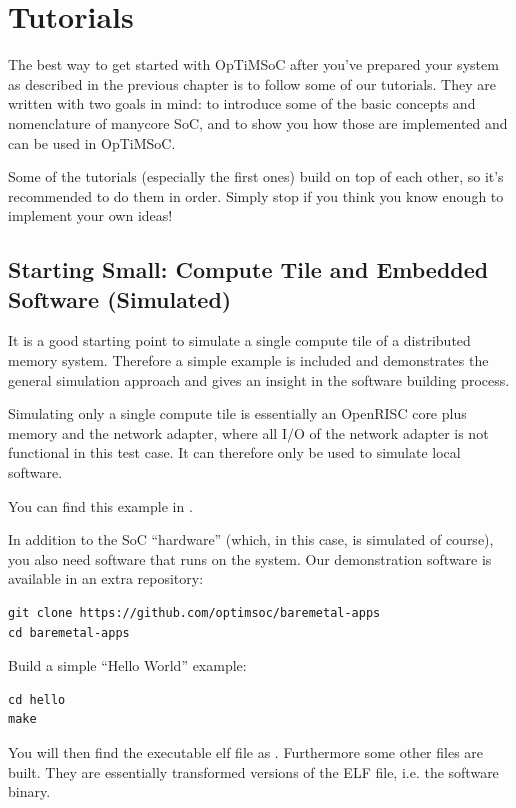\chapter{Tutorials}
\label{chap:tutorials}

The best way to get started with OpTiMSoC after you've prepared your
system as described in the previous chapter is to follow some of our
tutorials. They are written with two goals in mind: to introduce some
of the basic concepts and nomenclature of manycore SoC, and to show
you how those are implemented and can be used in OpTiMSoC.

Some of the tutorials (especially the first ones) build on top of each
other, so it's recommended to do them in order. Simply stop if you
think you know enough to implement your own ideas!


\section{Starting Small: Compute Tile and Embedded Software (Simulated)}

It is a good starting point to simulate a single compute tile of a
distributed memory system. Therefore a simple example is included and
demonstrates the general simulation approach and gives an insight in
the software building process.

Simulating only a single compute tile is essentially an OpenRISC core
plus memory and the network adapter, where all I/O of the network
adapter is not functional in this test case. It can therefore only be
used to simulate local software.

You can find this example in .

In addition to the SoC ``hardware'' (which, in this case, is simulated of course), you also need software that runs on the system.
Our demonstration software is available in an extra repository:

\begin{lstlisting}
git clone https://github.com/optimsoc/baremetal-apps
cd baremetal-apps
\end{lstlisting}

Build a simple ``Hello World'' example:

\begin{lstlisting}
cd hello
make
\end{lstlisting}

You will then find the executable elf file as .
Furthermore some other files are built.
They are essentially transformed versions of the ELF file, i.e. the software binary.


